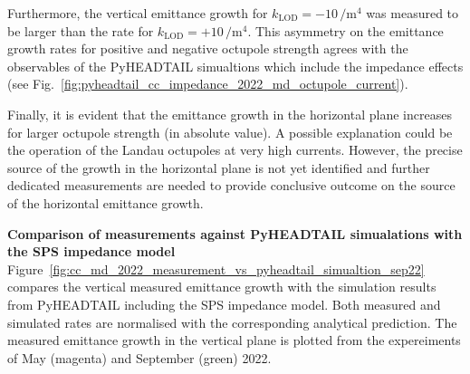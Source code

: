 Furthermore, the vertical emittance growth for $k_\mathrm{LOD}=-10$\,$\mathrm{/m^4}$ was measured to be larger than the rate for $k_\mathrm{LOD}=+10$\,$\mathrm{/m^4}$. This asymmetry on the emittance growth rates for positive and negative octupole strength agrees with the observables of the PyHEADTAIL simualtions which include the impedance effects (see Fig.~\ref{fig:pyheadtail_cc_impedance_2022_md_octupole_current}).

Finally, it is evident that the emittance growth in the horizontal plane increases for larger octupole strength (in absolute value). A possible explanation could be the operation of the Landau octupoles at very high currents. However, the precise source of the growth in the horizontal plane is not yet identified and further dedicated measurements are needed to provide conclusive outcome on the source of the horizontal emittance growth. 

\textbf{Comparison of measurements against PyHEADTAIL simualations with the SPS impedance model}\\
Figure~\ref{fig:cc_md_2022_measurement_vs_pyheadtail_simualtion_sep22} compares the vertical measured emittance growth with the simulation results from PyHEADTAIL including the SPS impedance model. Both measured and simulated rates are normalised with the corresponding analytical prediction. The measured emittance growth in the vertical plane is plotted from the expereiments of May (magenta) and September (green) 2022.

